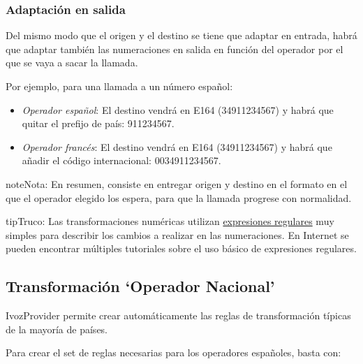\documentclass[letterpaper,10pt,spanish]{sphinxmanual}
\begin{document}
\subsubsection{Adaptación en salida}
\label{external_incoming_calls/numeric_transformations:outgoing-transformations}
Del mismo modo que el origen y el destino se tiene que adaptar en entrada, habrá que adaptar también las numeraciones en salida en función del operador por el que se vaya a sacar la llamada.

Por ejemplo, para una llamada a un número español:
\begin{itemize}
\item {} 
\emph{Operador español}: El destino vendrá en E164 (34911234567) y habrá que quitar el prefijo de país: 911234567.

\item {} 
\emph{Operador francés}: El destino vendrá en E164 (34911234567) y habrá que añadir el código internacional: 0034911234567.

\end{itemize}

\begin{notice}{note}{Nota:}
En resumen, consiste en entregar origen y destino en el formato en el que el operador elegido los espera, para que la llamada progrese con normalidad.
\end{notice}

\begin{notice}{tip}{Truco:}
Las transformaciones numéricas utilizan \href{https://es.wikipedia.org/wiki/Expresi\%C3\%B3n\_regular}{expresiones regulares} muy simples para describir los cambios a realizar en las numeraciones. En Internet se pueden encontrar múltiples tutoriales sobre el uso básico de expresiones regulares.
\end{notice}


\subsection{Transformación `Operador Nacional'}
\label{external_incoming_calls/numeric_transformations:national-provider-transformations}
IvozProvider permite crear automáticamente las reglas de transformación típicas de la mayoría de países.

Para crear el set de reglas necesarias para los operadores españoles, basta con:

\end{document}
